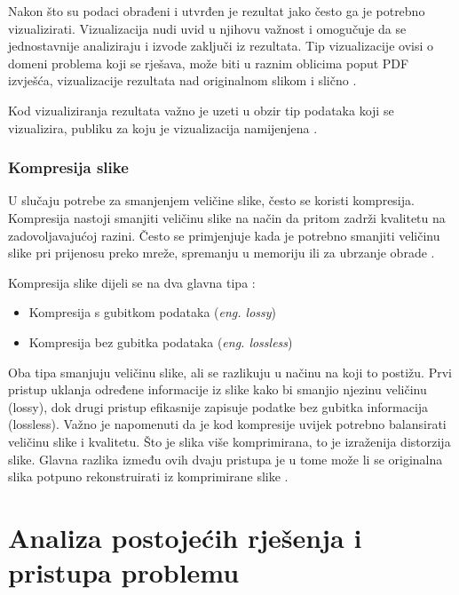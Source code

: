 \documentclass{foi}
\begin{document}
Nakon što su podaci obrađeni i utvrđen je rezultat jako često ga je potrebno vizualizirati. Vizualizacija nudi uvid u njihovu važnost i omogučuje da se jednostavnije analiziraju i izvode zaključi iz rezultata. 
Tip vizualizacije ovisi o domeni problema koji se rješava, može biti u raznim oblicima poput PDF izvješća, vizualizacije rezultata nad originalnom slikom i slično  \cite{Visulization}.

Kod vizualiziranja rezultata važno je uzeti u obzir tip podataka koji se vizualizira, publiku za koju je vizualizacija namijenjena \cite{Visulization}. 

\subsubsection{Kompresija slike}

U slučaju potrebe za smanjenjem veličine slike, često se koristi kompresija. Kompresija nastoji smanjiti veličinu slike na način da pritom zadrži kvalitetu na zadovoljavajućoj razini. Često se primjenjuje kada je potrebno smanjiti veličinu slike pri prijenosu preko mreže, spremanju u memoriju ili za ubrzanje obrade \cite{ImageProcessing}.

\begin{flushleft}
Kompresija slike dijeli se na dva glavna tipa \cite{Compression}:
\begin{itemize}
    \item Kompresija s gubitkom podataka (\textit{eng. lossy})
    \item Kompresija bez gubitka podataka (\textit{eng. lossless})
\end{itemize}
\end{flushleft}

Oba tipa smanjuju veličinu slike, ali se razlikuju u načinu na koji to postižu.  
Prvi pristup uklanja određene informacije iz slike kako bi smanjio njezinu veličinu (lossy), dok drugi pristup efikasnije zapisuje podatke bez gubitka informacija (lossless).  
Važno je napomenuti da je kod kompresije uvijek potrebno balansirati veličinu slike i kvalitetu. Što je slika više komprimirana, to je izraženija distorzija slike.  
Glavna razlika između ovih dvaju pristupa je u tome može li se originalna slika potpuno rekonstruirati iz komprimirane slike \cite{Compression}.

\pagebreak


\section{Analiza postojećih rješenja i pristupa problemu}
\end{document}
